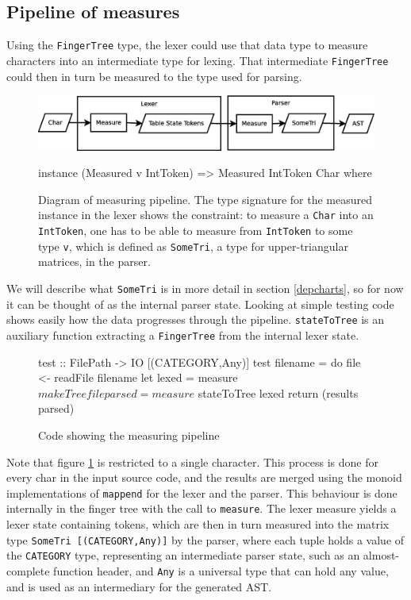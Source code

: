 \documentclass[a4paper,12pt,notitlepage]{report}
\begin{document}
\subsection{Pipeline of measures}
\label{pipeline}
Using the \texttt{FingerTree} type, the lexer could use that data type to
measure characters into an intermediate type for lexing. That intermediate
\texttt{FingerTree} could then in turn be measured to the type used for parsing.

\begin{figure}[H]
\includegraphics[width=\textwidth]{pipeline.eps}
\begin{code}
instance (Measured v IntToken) => Measured IntToken Char where
\end{code}
\caption{\label{pipelinedia} \small Diagram of measuring pipeline. The type signature
for the measured instance in the lexer shows the constraint: to measure a
\texttt{Char} into an \texttt{IntToken}, one has to be able to measure from
\texttt{IntToken} to some type \texttt{v}, which is defined as \texttt{SomeTri},
a type for upper-triangular matrices, in the parser.}
\end{figure}

We will describe what \texttt{SomeTri} is in more detail in section
\ref{depcharts}, so for now it can be thought of as the internal parser state.
Looking at simple testing code shows easily how the data progresses through the
pipeline.  \texttt{stateToTree} is an auxiliary function extracting a
\texttt{FingerTree} from the internal lexer state.

\begin{figure}[H]
\begin{code}
test :: FilePath -> IO [(CATEGORY,Any)]
test filename = do
    file <- readFile filename
    let lexed  = measure $ makeTree file
        parsed = measure $ stateToTree lexed
    return (results parsed)
\end{code} 
\caption{\small Code showing the measuring pipeline}
\end{figure}

Note that figure \ref{pipelinedia} is restricted to a single character. This
process is done for every char in the input source code, and the results are
merged using the monoid implementations of \texttt{mappend} for the lexer and
the parser. This behaviour is done internally in the finger tree with the call
to \texttt{measure}.  The lexer measure yields a lexer state containing tokens,
which are then in turn measured into the matrix type \texttt{SomeTri
[(CATEGORY,Any)]} by the parser, where each tuple holds a value of the
\texttt{CATEGORY} type, representing an intermediate parser state, such as an
almost-complete function header, and \texttt{Any} is a universal type that can
hold any value, and is used as an intermediary for the generated AST. 
\end{document}
